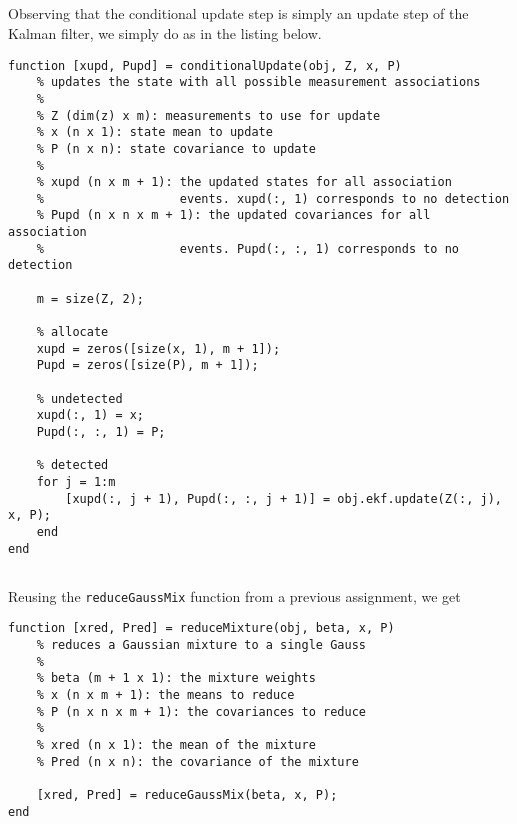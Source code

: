 \documentclass[]{article}
\begin{document}
\subsection{}
Observing that the conditional update step is simply an update step of the Kalman filter, we simply do as in the listing below.
\begin{lstlisting}[caption={PDAF Conditional Update}]
function [xupd, Pupd] = conditionalUpdate(obj, Z, x, P)
    % updates the state with all possible measurement associations
    %
    % Z (dim(z) x m): measurements to use for update
    % x (n x 1): state mean to update
    % P (n x n): state covariance to update
    %
    % xupd (n x m + 1): the updated states for all association
    %                   events. xupd(:, 1) corresponds to no detection
    % Pupd (n x n x m + 1): the updated covariances for all association
    %                   events. Pupd(:, :, 1) corresponds to no detection

    m = size(Z, 2);

    % allocate
    xupd = zeros([size(x, 1), m + 1]);
    Pupd = zeros([size(P), m + 1]);

    % undetected
    xupd(:, 1) = x;
    Pupd(:, :, 1) = P;

    % detected
    for j = 1:m
        [xupd(:, j + 1), Pupd(:, :, j + 1)] = obj.ekf.update(Z(:, j), x, P);
    end
end
\end{lstlisting}

\subsection{}
Reusing the \texttt{reduceGaussMix} function from a previous assignment, we get
\begin{lstlisting}[caption={PDAF Mixture Reduction Step}]
function [xred, Pred] = reduceMixture(obj, beta, x, P)
    % reduces a Gaussian mixture to a single Gauss
    %
    % beta (m + 1 x 1): the mixture weights
    % x (n x m + 1): the means to reduce
    % P (n x n x m + 1): the covariances to reduce
    %
    % xred (n x 1): the mean of the mixture
    % Pred (n x n): the covariance of the mixture

    [xred, Pred] = reduceGaussMix(beta, x, P);
end
\end{lstlisting}
\end{document}
